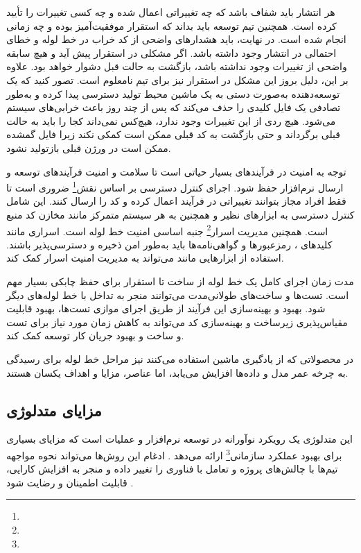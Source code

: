 هر انتشار باید شفاف باشد که چه تغییراتی اعمال شده و چه کسی تغییرات را تأیید کرده است. همچنین تیم توسعه باید بداند که استقرار موفقیت‌آمیز بوده و چه زمانی انجام شده است. در نهایت، باید هشدارهای واضحی از کد خراب در خط لوله و خطای احتمالی در انتشار وجود داشته باشد. اگر مشکلی در استقرار پیش آید و هیچ سابقه واضحی از تغییرات وجود نداشته باشد، بازگشت به حالت قبل دشوار خواهد بود. علاوه بر این، دلیل بروز این مشکل در استقرار نیز برای تیم نامعلوم است. تصور کنید که یک توسعه‌دهنده به‌صورت دستی به یک ماشین محیط تولید دسترسی پیدا کرده و به‌طور تصادفی یک فایل کلیدی را حذف می‌کند که پس از چند روز باعث خرابی‌های سیستم می‌شود. هیچ ردی از این تغییرات وجود ندارد، هیچ‌کس نمی‌داند کجا را باید به حالت قبلی برگرداند و حتی بازگشت به کد قبلی ممکن است کمکی نکند زیرا فایل گمشده ممکن است در ورژن قبلی بازتولید نشود.

توجه به امنیت در فرآیندهای  بسیار حیاتی است تا سلامت و امنیت فرآیندهای توسعه و ارسال نرم‌افزار حفظ شود. اجرای کنترل دسترسی بر اساس نقش\footnote{} ضروری است تا فقط افراد مجاز بتوانند تغییراتی در فرآیند  اعمال کرده و کد را ارسال کنند. این شامل کنترل دسترسی به ابزارهای  نظیر  و همچنین به هر سیستم متمرکز مانند مخازن کد منبع است. همچنین مدیریت اسرار\footnote{} جنبه اساسی امنیت خط لوله است. اسراری مانند کلیدهای ، رمزعبورها و گواهی‌نامه‌ها باید به‌طور امن ذخیره و دسترسی‌پذیر باشند. استفاده از ابزارهایی مانند  می‌تواند به مدیریت امنیت اسرار کمک کند.

مدت زمان اجرای کامل یک خط لوله از ساخت تا استقرار برای حفظ چابکی بسیار مهم است. تست‌ها و ساخت‌های طولانی‌مدت می‌توانند منجر به تداخل با خط لوله‌های دیگر شود. بهبود و بهینه‌سازی این فرآیند از طریق اجرای موازی تست‌ها، بهبود قابلیت مقیاس‌پذیری زیرساخت و بهینه‌سازی کد می‌تواند به کاهش زمان مورد نیاز برای تست و ساخت و بهبود جریان کار توسعه کمک کند.

در محصولاتی که از یادگیری ماشین استفاده می‌کنند نیز مراحل خط لوله برای رسیدگی به چرخه عمر مدل و داده‌ها افزایش می‌یابد، اما عناصر، مزایا و اهداف یکسان هستند.
 

\subsection{مزایای متدلوژی }
این متدلوژی یک رویکرد نوآورانه‌ در توسعه نرم‌افزار و عملیات است که مزایای بسیاری برای بهبود عملکرد سازمانی\footnote{} ارائه می‌دهد \cite{Devopsorg}. ادغام این روش‌ها می‌تواند نحوه مواجهه تیم‌ها با چالش‌های پروژه و تعامل با فناوری را تغییر داده و منجر به افزایش کارایی، قابلیت اطمینان و رضایت شود \cite{DevopsDef2}.

